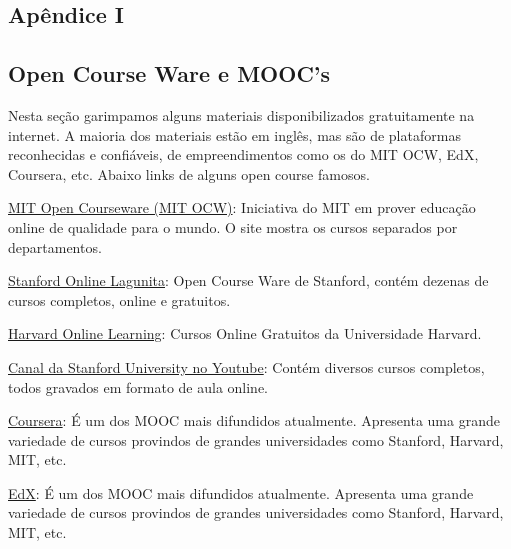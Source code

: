 \documentclass[a5paper,10pt]{article}
\numberwithin{equation}{section}
\begin{document}
\begin{appendix}

\section{Apêndice I}

\subsection{Open Course Ware e MOOC's}

Nesta seção garimpamos alguns materiais disponibilizados gratuitamente na 
internet. A maioria dos materiais estão em inglês, mas são de plataformas 
reconhecidas e confiáveis, de empreendimentos como os do MIT OCW, EdX, 
Coursera, etc. Abaixo links de alguns open course famosos.

\href{https://ocw.mit.edu/courses/find-by-department/}{MIT Open
Courseware (MIT OCW)}: Iniciativa do MIT em prover educação
online de qualidade para o mundo. O site mostra os cursos separados 
por departamentos.

\href{https://lagunita.stanford.edu/}{Stanford Online Lagunita}: 
Open Course Ware de Stanford, contém dezenas de cursos completos,
online e gratuitos.

\href{https://online-learning.harvard.edu/}{Harvard Online 
Learning}: Cursos Online Gratuitos da Universidade Harvard.

\href{https://www.youtube.com/stanford}{Canal da Stanford University
no Youtube}: Contém diversos cursos completos, todos gravados em
formato de aula online.

\href{https://www.coursera.org/}{Coursera}: É um dos MOOC mais
difundidos atualmente. Apresenta uma grande variedade de cursos
provindos de grandes universidades como Stanford, Harvard, MIT,
etc.

\href{https://www.edx.org/}{EdX}: É um dos MOOC mais
difundidos atualmente. Apresenta uma grande variedade de cursos
provindos de grandes universidades como Stanford, Harvard, MIT,
etc.


\end{appendix}

\printindex
\end{document}
